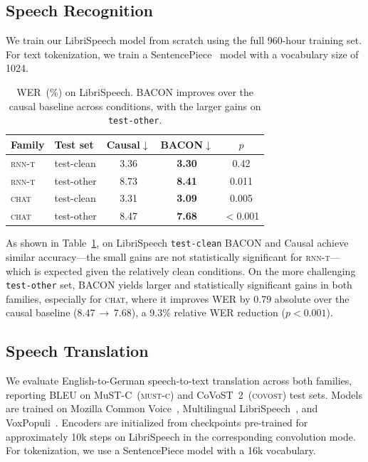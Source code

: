 \documentclass[cameraready]{Interspeech}
\begin{document}
\subsection{Speech Recognition}
\label{subsec:libri}

We train our LibriSpeech model from scratch using the full 960-hour training
set. For text tokenization, we train a SentencePiece~\cite{kudo2018sentencepiece}
model with a vocabulary size of 1024.

\begin{table}[h]
\centering
\caption{WER~(\%) on LibriSpeech. BACON improves over the causal baseline
across conditions, with the larger gains on \texttt{test-other}.}
\label{tab:libri_wer}
\begin{tabular}{llccc}
\toprule
\textbf{Family} & \textbf{Test set} & \textbf{Causal}$\downarrow$ & \textbf{BACON}$\downarrow$ & $p$ \\
\midrule
\textsc{rnn-t} & test-clean & 3.36 & \textbf{3.30} & 0.42 \\
\textsc{rnn-t} & test-other & 8.73 & \textbf{8.41} & 0.011 \\
\midrule
\textsc{chat} & test-clean & 3.31 & \textbf{3.09} & 0.005 \\
\textsc{chat} & test-other & 8.47 & \textbf{7.68} & $<$0.001 \\
\bottomrule
\end{tabular}
\end{table}


As shown in Table~\ref{tab:libri_wer}, on LibriSpeech \texttt{test-clean} BACON and Causal achieve similar accuracy---the small gains are not statistically significant for \textsc{rnn-t}---which is expected given the relatively clean conditions. 
On the more challenging \texttt{test-other} set, BACON yields larger and statistically significant gains in both families, especially for \textsc{chat}, where it improves WER by 0.79 absolute over the causal baseline ($8.47\,{\rightarrow}\,7.68$), a 9.3\% relative WER reduction ($p<0.001$).

\subsection{Speech Translation}
\label{subsec:ast}

We evaluate English-to-German speech-to-text translation across both families, reporting BLEU on MuST-C~(\textsc{must-c}) and CoVoST~2~(\textsc{covost}) test sets. 
Models are trained on Mozilla Common Voice~\cite{ardila2020common}, Multilingual LibriSpeech~\cite{pratap2020mls}, and VoxPopuli~\cite{wang2021voxpopuli}.
Encoders are initialized from checkpoints pre-trained for approximately 10k steps on LibriSpeech in the corresponding convolution mode. 
For tokenization, we use a SentencePiece model with a 16k vocabulary.
\end{document}
